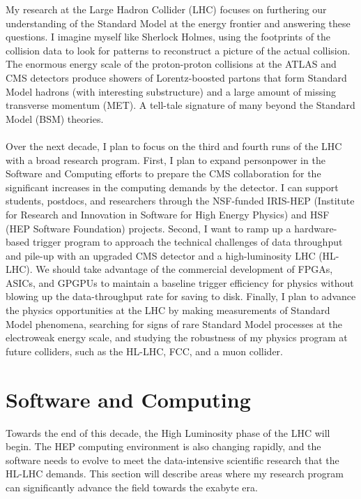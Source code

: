 \documentclass[10pt,a4paper,sans]{moderncv} %
\begin{document}
My research at the Large Hadron Collider (LHC) focuses on furthering our understanding of the Standard Model at the energy frontier and answering these questions. I imagine myself like Sherlock Holmes, using the footprints of the collision data to look for patterns to reconstruct a picture of the actual collision. The enormous energy scale of the proton-proton collisions at the ATLAS and CMS detectors produce showers of Lorentz-boosted partons that form Standard Model hadrons (with interesting substructure) and a large amount of missing transverse momentum (MET). A tell-tale signature of many beyond the Standard Model (BSM) theories.
\\
\\
Over the next decade, I plan to focus on the third and fourth runs of the LHC with a broad research program. First, I plan to expand personpower in the Software and Computing efforts to prepare the CMS collaboration for the significant increases in the computing demands by the detector. I can support students, postdocs, and researchers through the NSF-funded IRIS-HEP (Institute for Research and Innovation in Software for High Energy Physics) and HSF (HEP Software Foundation) projects. Second, I want to ramp up a hardware-based trigger program to approach the technical challenges of data throughput and pile-up with an upgraded CMS detector and a high-luminosity LHC (HL-LHC). We should take advantage of the commercial development of FPGAs, ASICs, and GPGPUs to maintain a baseline trigger efficiency for physics without blowing up the data-throughput rate for saving to disk. Finally, I plan to advance the physics opportunities at the LHC by making measurements of Standard Model phenomena, searching for signs of rare Standard Model processes at the electroweak energy scale, and studying the robustness of my physics program at future colliders, such as the HL-LHC, FCC, and a muon collider.

\section{Software and Computing}
Towards the end of this decade, the High Luminosity phase of the LHC will begin. The HEP computing environment is also changing rapidly, and the software needs to evolve to meet the data-intensive scientific research that the HL-LHC demands. This section will describe areas where my research program can significantly advance the field towards the exabyte era.
\end{document}
